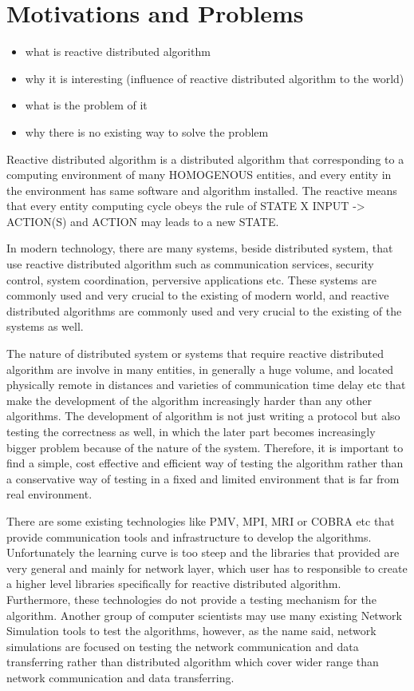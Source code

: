 
\section{Motivations and Problems}
\begin{itemize}
\item what is reactive distributed algorithm
\item why it is interesting (influence of reactive distributed algorithm to the world)
\item what is the problem of it
\item why there is no existing way to solve the problem
\end{itemize}

Reactive distributed algorithm is a distributed algorithm that corresponding to a computing environment of many HOMOGENOUS entities, and every entity in the environment has same software and algorithm installed. The reactive means that every entity computing cycle obeys the rule of STATE X INPUT -> ACTION(S) and ACTION may leads to a new STATE.

In modern technology, there are many systems, beside distributed system, that use reactive distributed algorithm such as communication services, security control, system coordination, perversive applications etc. These systems are commonly used and very crucial to the existing of modern world, and reactive distributed algorithms are commonly used and very crucial to the existing of the systems as well.

The nature of distributed system or systems that require reactive distributed algorithm are involve in many entities, in generally a huge volume, and located physically remote in distances and varieties of communication time delay etc that make the development of the algorithm increasingly harder than any other algorithms. The development of algorithm is not just writing a protocol but also testing the correctness as well, in which the later part becomes increasingly bigger problem because of the nature of the system. Therefore, it is important to find a simple, cost effective and efficient way of testing the algorithm rather than a conservative way of testing in a fixed and limited environment that is far from real environment.

There are some existing technologies like PMV, MPI, MRI or COBRA etc that provide communication tools and infrastructure to develop the algorithms. Unfortunately the learning curve is too steep and the libraries that provided are very general and mainly for network layer, which user has to responsible to create a higher level libraries specifically for reactive distributed algorithm. Furthermore, these technologies do not provide a testing mechanism for the algorithm. Another group of computer scientists may use many existing Network Simulation tools to test the algorithms, however, as the name said, network simulations are focused on testing the network communication and data transferring rather than distributed algorithm which cover wider range than network communication and data transferring.

